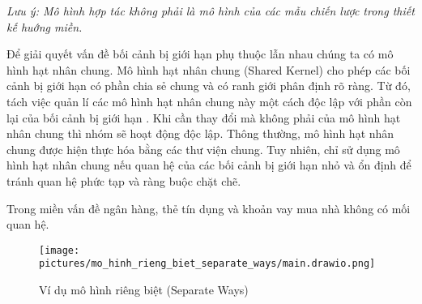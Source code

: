 \emph{Lưu ý: Mô hình hợp tác không phải là mô hình của các mẫu chiến lược trong thiết kế huớng miền.}

Để giải quyết vấn đề bối cảnh bị giới hạn phụ thuộc lẫn nhau chúng ta có mô hình hạt nhân chung. Mô hình hạt nhân chung (Shared Kernel) cho phép các bối cảnh bị giới hạn có phần chia sẻ chung và có ranh giới phân định rõ ràng. Từ đó, tách việc quản lí các mô hình hạt nhân chung này một cách độc lập với phần còn lại của bối cảnh bị giới hạn . Khi cần thay đổi mà không phải của mô hình hạt nhân chung thì nhóm sẽ hoạt động độc lập. Thông thường, mô hình hạt nhân chung được hiện thực hóa bằng các thư viện chung. Tuy nhiên, chỉ sử dụng mô hình hạt nhân chung nếu quan hệ của các bối cảnh bị giới hạn nhỏ và ổn định để tránh quan hệ phức tạp và ràng buộc chặt chẽ.



















\begin{example} Trong miền vấn đề ngân hàng, thẻ tín dụng và khoản vay mua nhà không có mối quan hệ.

\begin{figure}[H]

\centering

\texttt{[image: pictures/mo\_hinh\_rieng\_biet\_separate\_ways/main.drawio.png]}

\caption{Ví dụ mô hình riêng biệt (Separate Ways)}

\end{figure}

\end{example}

